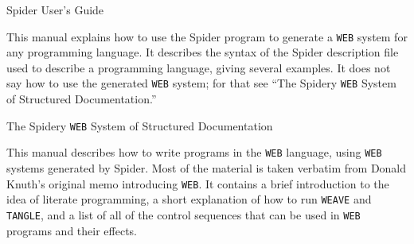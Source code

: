 \centerline{Spider User's Guide}

This manual explains how to use the {Spider} program to generate a
{\tt WEB} system for any programming language.
It describes the syntax of the {Spider} description file used to
describe a programming language, giving several examples.
It does not say how to use the generated {\tt WEB} system; for that
see ``The Spidery {\tt WEB} System of Structured Documentation.''

\bigskip

\centerline{The Spidery {\tt WEB} System of Structured Documentation}


This manual describes how to write programs in the {\tt WEB} language,
using {\tt WEB} systems generated by {Spider}.
Most of the material is taken verbatim from Donald Knuth's original
memo introducing {\tt WEB}.
It contains a brief introduction to the idea of literate programming,
a short explanation of how to run {\tt WEAVE} and {\tt TANGLE}, and a
list of all of the control sequences that can be used in {\tt WEB}
programs and their effects.

